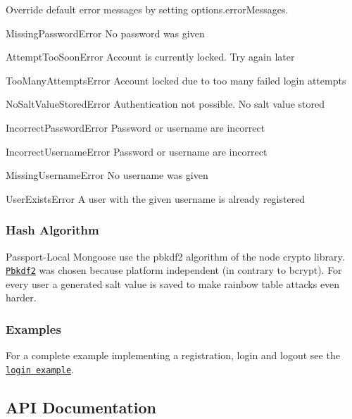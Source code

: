 Override default error messages by setting options.\+error\+Messages.


\begin{DoxyItemize}
\item Missing\+Password\+Error \textquotesingle{}No password was given\textquotesingle{}
\item Attempt\+Too\+Soon\+Error \textquotesingle{}Account is currently locked. Try again later\textquotesingle{}
\item Too\+Many\+Attempts\+Error \textquotesingle{}Account locked due to too many failed login attempts\textquotesingle{}
\item No\+Salt\+Value\+Stored\+Error \textquotesingle{}Authentication not possible. No salt value stored\textquotesingle{}
\item Incorrect\+Password\+Error \textquotesingle{}Password or username are incorrect\textquotesingle{}
\item Incorrect\+Username\+Error \textquotesingle{}Password or username are incorrect\textquotesingle{}
\item Missing\+Username\+Error \textquotesingle{}No username was given\textquotesingle{}
\item User\+Exists\+Error \textquotesingle{}A user with the given username is already registered\textquotesingle{}
\end{DoxyItemize}

\subsubsection*{Hash Algorithm}

Passport-\/\+Local Mongoose use the pbkdf2 algorithm of the node crypto library. \href{http://en.wikipedia.org/wiki/PBKDF2}{\tt Pbkdf2} was chosen because platform independent (in contrary to bcrypt). For every user a generated salt value is saved to make rainbow table attacks even harder.

\subsubsection*{Examples}

For a complete example implementing a registration, login and logout see the \href{https://github.com/saintedlama/passport-local-mongoose/tree/master/examples/login}{\tt login example}.

\subsection*{A\+PI Documentation}

